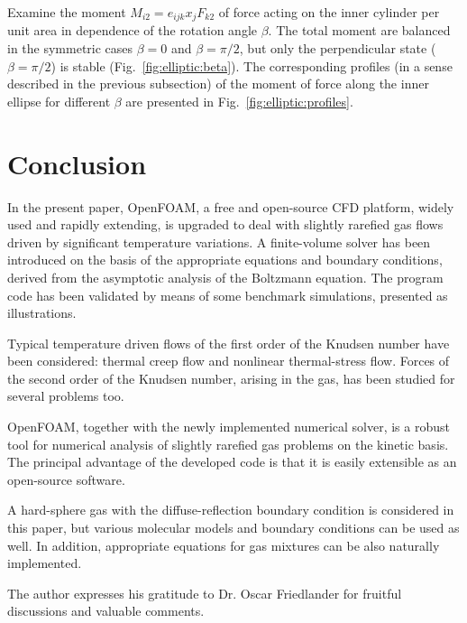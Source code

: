 \documentclass[smallextended, final]{svjour3} %
\begin{document}
Examine the moment \(M_{i2} = e_{ijk}x_jF_{k2}\) of force acting on the inner cylinder
per unit area in dependence of the rotation angle \(\beta\).
The total moment are balanced in the symmetric cases \(\beta=0\) and \(\beta=\pi/2\),
but only the perpendicular state (\(\beta=\pi/2\)) is stable (Fig.~\ref{fig:elliptic:beta}).
The corresponding profiles (in a sense described in the previous subsection)
of the moment of force along the inner ellipse for different \(\beta\)
are presented in Fig.~\ref{fig:elliptic:profiles}.

\section{Conclusion}

In the present paper, OpenFOAM\textregistered{}, a free and open-source CFD platform,
widely used and rapidly extending, is upgraded to deal with
slightly rarefied gas flows driven by significant temperature variations.
A finite-volume solver has been introduced on the basis of the appropriate
equations and boundary conditions, derived from the asymptotic analysis of the Boltzmann equation.
The program code has been validated by means of some benchmark simulations,
presented as illustrations.

Typical temperature driven flows of the first order of the Knudsen number have been considered:
thermal creep flow and nonlinear thermal-stress flow.
Forces of the second order of the Knudsen number, arising in the gas,
has been studied for several problems too.

OpenFOAM\textregistered{}, together with the newly implemented numerical solver,
is a robust tool for numerical analysis of slightly rarefied gas problems
on the kinetic basis. The principal advantage of the developed code is that
it is easily extensible as an open-source software.

A hard-sphere gas with the diffuse-reflection boundary condition is considered in this paper,
but various molecular models and boundary conditions can be used as well.
In addition, appropriate equations for gas mixtures can be also naturally implemented.

\begin{acknowledgements}
The author expresses his gratitude to Dr. Oscar Friedlander
for fruitful discussions and valuable comments.
\end{acknowledgements}


\end{document}

